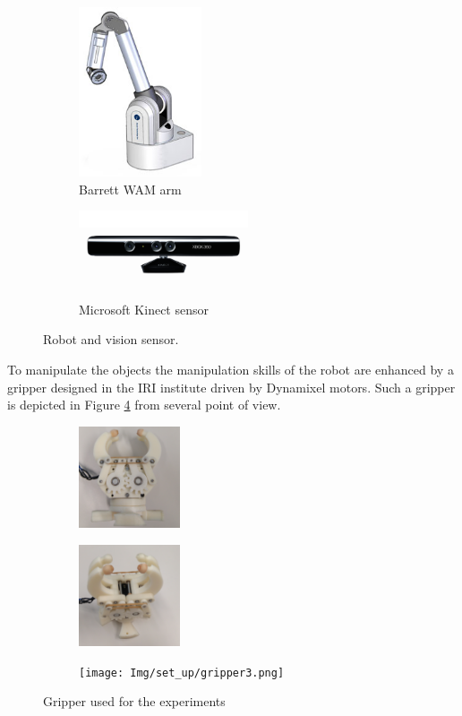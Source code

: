 \begin{figure}[htp]
\centering
\begin{subfigure}[b]{0.45\textwidth}
\centering
\includegraphics[height=5cm]{Img/set_up/wam.jpg}
\caption{Barrett WAM arm}\label{fig:wam_1}
\end{subfigure}
\begin{subfigure}[b]{0.45\textwidth}
\centering
\includegraphics[width=5cm]{Img/set_up/Kinect.jpg}
\caption{Microsoft Kinect sensor}\label{fig:wam_1}
\end{subfigure}
\caption{Robot and vision sensor.}
\end{figure}


To manipulate the objects the manipulation skills of the robot are enhanced by a gripper designed in the IRI institute driven by Dynamixel motors. Such a gripper is depicted in Figure \ref{fig:gripper_general} from several point of view. 

\begin{figure}[htp]
\centering
\begin{subfigure}[b]{0.3\textwidth}
\centering
\includegraphics[height=3cm]{Img/set_up/gripper1.png}
\end{subfigure}
\begin{subfigure}[b]{0.3\textwidth}
\centering
\includegraphics[height=3cm]{Img/set_up/gripper2.png}
\end{subfigure}
\begin{subfigure}[b]{0.3\textwidth}
\centering
\texttt{[image: Img/set\_up/gripper3.png]}
\end{subfigure}
\caption{Gripper used for the experiments}\label{fig:gripper_general}
\end{figure}

